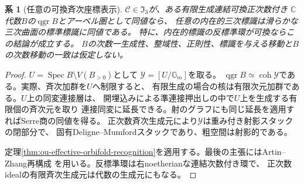 \documentclass[11pt,a4paper]{ltjsarticle}
\newtheorem{corollary}[theorem]{系}
\theoremstyle{definition}
\newcommand{\qgr}{\operatorname{qgr}}
\newcommand{\coh}{\operatorname{coh}}
\begin{document}
\begin{corollary}[任意の可換斉次座標表示]
\label{cor:ou-commutative-graded-recognition}
$\mathcal C\in\mathfrak I_3$が、ある有限生成連結可換正次数付き
$\mathbb C$代数$B$の$\qgr B$とアーベル圏として同値なら、
任意の内在的三次標識は滑らかな三次曲面の標準標識に同値である。
特に、内在的標識の反標準環が可換ならこの結論が成立する。
$B$の次数一生成性、整域性、正則性、標識を与える移動と$B$の次数移動の一致は仮定しない。
\end{corollary}
\begin{proof}
$U=\operatorname{Spec}B\setminus V(B_{>0})$として
$\mathcal Y=[U/\mathbb G_m]$を取る。
$\qgr B\simeq\coh\mathcal Y$である。実際、斉次加群を$U$へ制限すると、
有限生成の場合の核は有限次元加群である。$U$上の同変連接層は、
開埋込みによる準連接押出しの中で$U$上を生成する有限個の斉次元を取り
連接同変に延長できる。射のグラフにも同じ延長を適用すればSerre商の同値を得る。
正次数斉次生成元により$\mathcal Y$は重み付き射影スタックの閉部分で、
固有Deligne--Mumfordスタックであり、粗空間は射影的である。

定理\ref{thm:ou-effective-orbifold-recognition}を適用する。最後の主張にはArtin--Zhang再構成
\cite[Theorem~4.5]{AZ1994}を用いる。反標準環は右noetherianな連結次数付き環で、
正次数idealの有限斉次生成元は代数の生成元にもなる。
\end{proof}
\end{document}
